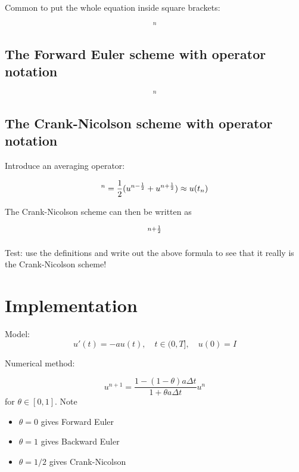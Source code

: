 \documentclass[%
oneside,                 %
final,                   %
10pt]{article}
\begin{document}
Common to put the whole equation inside square brackets:

\begin{equation}
[D_t^- u  = -au]^n
\end{equation}

\subsection*{The Forward Euler scheme with operator notation}

\begin{equation}
[D_t^+ u  = -au]^n
\end{equation}

\subsection*{The Crank-Nicolson scheme with operator notation}

Introduce an averaging operator:

\begin{equation}
[\overline{u}^{t}]^n = \half (u^{n-\half} + u^{n+\half} )
\approx u(t_n) \label{fd:mean:a}
\end{equation}

The Crank-Nicolson scheme can then be written as

\begin{equation}
[D_t u = -a\overline{u}^t]^{n+\half}
\label{fd:compact:ex:CN}
\end{equation}

Test: use the definitions and write out the above formula to see that
it really is the Crank-Nicolson scheme!


\section*{Implementation}
\label{decay:impl1}

Model:
\[
u'(t) = -au(t),\quad t\in (0,T], \quad u(0)=I
\]

Numerical method:

\[
u^{n+1} = \frac{1 - (1-\theta) a\Delta t}{1 + \theta a\Delta t}u^n
\]
for $\theta\in [0,1]$. Note

\begin{itemize}
 \item $\theta=0$ gives Forward Euler

 \item $\theta=1$ gives Backward Euler

 \item $\theta=1/2$ gives Crank-Nicolson
\end{itemize}
\end{document}
